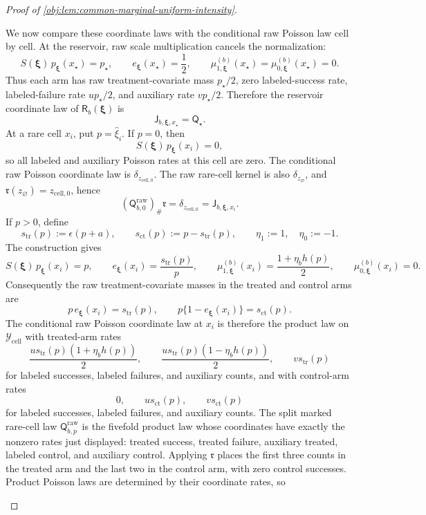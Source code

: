 \documentclass[11pt]{article}
\begin{document}
\begin{proof}[Proof of \cref{obj:lem:common-marginal-uniform-intensity}]
\begin{enumerate}
We now compare these coordinate laws with the conditional raw Poisson law cell by cell. At the reservoir, raw scale multiplication cancels the normalization:
\[
S(\boldsymbol\xi)\,p_{\boldsymbol\xi}(x_\star)=p_\star,
\qquad e_{\boldsymbol\xi}(x_\star)=\frac12,
\qquad \mu^{(b)}_{1,\boldsymbol\xi}(x_\star)=\mu^{(b)}_{0,\boldsymbol\xi}(x_\star)=0.
\]
Thus each arm has raw treatment-covariate mass \(p_\star/2\), zero labeled-success rate, labeled-failure rate \(u p_\star/2\), and auxiliary rate \(v p_\star/2\). Therefore the reservoir coordinate law of \(\mathsf R_b(\boldsymbol\xi)\) is
\[
\mathsf J_{b,\boldsymbol\xi,x_\star}=\mathsf Q_\star .
\]
At a rare cell \(x_i\), put \(p=\widehat\xi_i\). If \(p=0\), then
\[
S(\boldsymbol\xi)\,p_{\boldsymbol\xi}(x_i)=0,
\]
so all labeled and auxiliary Poisson rates at this cell are zero. The conditional raw Poisson coordinate law is \(\delta_{z_{\mathrm{cell},0}}\). The raw rare-cell kernel is also \(\delta_{z_{\varnothing}}\), and \(\mathfrak r(z_{\varnothing})=z_{\mathrm{cell},0}\), hence
\[
(\mathsf Q^{\mathrm{raw}}_{b,0})_\#\mathfrak r
=\delta_{z_{\mathrm{cell},0}}
=\mathsf J_{b,\boldsymbol\xi,x_i} .
\]
If \(p>0\), define
\[
s_{\mathrm{tr}}(p):=\epsilon(p+a),
\qquad
s_{\mathrm{ct}}(p):=p-s_{\mathrm{tr}}(p),
\qquad
\eta_1:=1,
\quad
\eta_0:=-1.
\]
The construction gives
\[
S(\boldsymbol\xi)\,p_{\boldsymbol\xi}(x_i)=p,
\qquad
e_{\boldsymbol\xi}(x_i)=\frac{s_{\mathrm{tr}}(p)}{p},
\qquad
\mu^{(b)}_{1,\boldsymbol\xi}(x_i)=\frac{1+\eta_b h(p)}2,
\qquad
\mu^{(b)}_{0,\boldsymbol\xi}(x_i)=0.
\]
Consequently the raw treatment-covariate masses in the treated and control arms are
\[
p\,e_{\boldsymbol\xi}(x_i)=s_{\mathrm{tr}}(p),
\qquad
p\{1-e_{\boldsymbol\xi}(x_i)\}=s_{\mathrm{ct}}(p).
\]
The conditional raw Poisson coordinate law at \(x_i\) is therefore the product law on \(\mathcal Y_{\mathrm{cell}}\) with treated-arm rates
\[
\frac{u s_{\mathrm{tr}}(p)(1+\eta_b h(p))}{2},
\qquad
\frac{u s_{\mathrm{tr}}(p)(1-\eta_b h(p))}{2},
\qquad
v s_{\mathrm{tr}}(p)
\]
for labeled successes, labeled failures, and auxiliary counts, and with control-arm rates
\[
0,
\qquad
u s_{\mathrm{ct}}(p),
\qquad
v s_{\mathrm{ct}}(p)
\]
for labeled successes, labeled failures, and auxiliary counts. The split marked rare-cell law \(\mathsf Q^{\mathrm{raw}}_{b,p}\) is the fivefold product law whose coordinates have exactly the nonzero rates just displayed: treated success, treated failure, auxiliary treated, labeled control, and auxiliary control. Applying \(\mathfrak r\) places the first three counts in the treated arm and the last two in the control arm, with zero control successes. Product Poisson laws are determined by their coordinate rates, so

\end{enumerate}
\end{proof}
\end{document}
